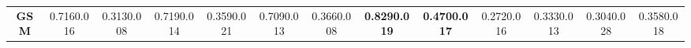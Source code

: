 \documentclass[11pt]{article}
\begin{document}
\begin{table*}[ ]
{\begin{tabular}{c|cccc|cccc|cccc|}
\textbf{GSM}                                                & 0.7160.016                                                    & 0.3130.008                                                 & 0.7190.014                                                     & 0.3590.021                                                  & 0.7090.013                                                    & 0.3660.008                                                 & \textbf{0.8290.019}                                                     & \textbf{0.4700.017}                                                  & 0.2720.016                                                    & 0.3330.013                                                 & 0.3040.028                                                     & 0.3580.018                                                  \\


\end{tabular}}
\end{table*}
\end{document}
